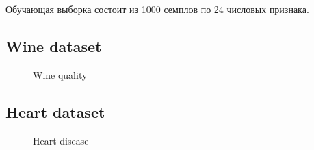 \documentclass[12pt,twoside]{article}
\theoremstyle{plain}
\theoremstyle{remark}
\theoremstyle{definition}
\begin{document}



Обучающая выборка состоит из 1000 семплов по 24 числовых признака. 

\newpage

\subsection{Wine dataset}


\begin{figure}[H]
      \caption{Wine quality}
\end{figure}




\newpage

\subsection{Heart dataset}

\begin{figure}[H]
      \caption{Heart disease}
\end{figure}
\end{document}

